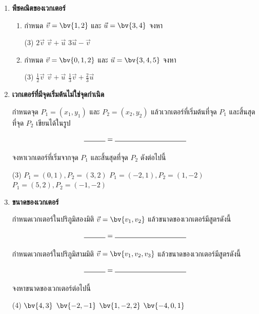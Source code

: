 \begin{enumerate}
\item \textbf{พีชคณิตของเวกเตอร์} 

\begin{enumerate}
\item กำหนด $\vec{v} = \bv{1,2}$ และ $\vec{u} = \bv{3,4}$ จงหา
\begin{tasks}(3)
\task $2\vec{v}$
\task $\vec{v} + \vec{u}$
\task $3\vec{u} - \vec{v}$
\end{tasks}
\vspace{30pt}
\item กำหนด $\vec{v} = \bv{0,1,2}$ และ $\vec{u} = \bv{3,4,5}$ จงหา
\begin{tasks}(3)
\task $\frac{1}{2}\vec{v}$
\task $\vec{v} + \vec{u}$
\task $\frac{1}{3}\vec{v} + \frac{2}{3}\vec{u}$
\end{tasks}
\vspace{30pt}
\end{enumerate}

\item \textbf{เวกเตอร์ที่มีจุดเริ่มต้นไม่ใช่จุดกำเนิด} 

กำหนดจุด $P_1 = (x_1,y_1)$ และ $P_2 = (x_2, y_2)$ แล้วเวกเตอร์ที่เริ่มต้นที่จุด $P_1$ และสิ้นสุดที่จุด $P_2$ เขียนได้ในรูป

\[\rule{30pt}{.5pt} = \rule{100pt}{.5pt}\]

จงหาเวกเตอร์ที่เริ่มจากจุด $P_1$ และสิ้นสุดที่จุด $P_2$ ดังต่อไปนี้
\begin{tasks}(3)
\task $P_1 = (0,1),  P_2 = (3,2)$
\task $P_1 = (-2,1), P_2 = (1,-2)$
\task $P_1 = (5,2),  P_2 = (-1,-2)$
\end{tasks}
\vspace{50pt}

\item \textbf{ขนาดของเวกเตอร์} 

กำหนดเวกเตอร์ในปริภูมิสองมิติ $\vec{v} = \bv{v_1,v_2}$ แล้วขนาดของเวกเตอร์มีสูตรดังนี้ 

\[\rule{30pt}{.5pt} = \rule{100pt}{.5pt}\]

กำหนดเวกเตอร์ในปริภูมิสามมิติ $\vec{v} = \bv{v_1,v_2,v_3}$ แล้วขนาดของเวกเตอร์มีสูตรดังนี้

\[\rule{30pt}{.5pt} = \rule{100pt}{.5pt}\]

จงหาขนาดของเวกเตอร์ต่อไปนี้
\begin{tasks}(4)
\task $\bv{4,3}$
\task $\bv{-2, -1}$
\task $\bv{1,-2,2}$
\task $\bv{-4,0,1}$
\end{tasks}
\vspace{50pt}


\end{enumerate}
